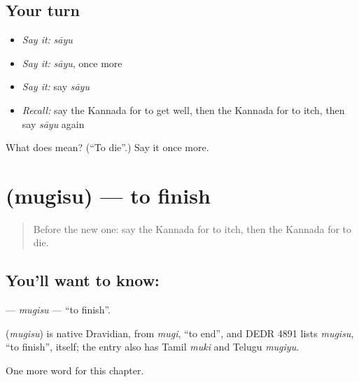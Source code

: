 \subsection*{Your turn}
\begin{itemize}
\raggedright
  \item \emph{Say it:} \emph{sāyu}
  \item \emph{Say it:} \emph{sāyu}, once more
  \item \emph{Say it:} say \emph{sāyu}
  \item \emph{Recall:} say the Kannada for to get well, then the Kannada for to itch, then say \emph{sāyu} again
\end{itemize}

\begin{tcolorbox}[breakable,colback=teal!4,colframe=teal!35!black,title={Before you move on}]
What does  mean? (\textquotedblleft{}To die\textquotedblright{}.) Say it once more.
\end{tcolorbox}
\section[\texorpdfstring{\kn{ಮುಗಿಸು} (mugisu)}{ಮುಗಿಸು (mugisu)}]{ (mugisu) — to finish}

\label{lesson:KA-C200-mugisu}



\begin{quote}
Before the new one: say the Kannada for to itch, then the Kannada for to die.
\end{quote}

\subsection*{You'll want to know: }
\textbf{} — \emph{mugisu} — \textquotedblleft{}to finish\textquotedblright{}.

\begin{cousinweb}
\textbf{} (\emph{mugisu}) is native Dravidian, from \emph{mugi}, \textquotedblleft{}to end\textquotedblright{}, and DEDR 4891 lists \emph{mugisu}, \textquotedblleft{}to finish\textquotedblright{}, itself; the entry also has Tamil \emph{muki} and Telugu \emph{mugiyu}.
\end{cousinweb}

\begin{grammarlens}[title={What you've built}]
One more word for this chapter.
\end{grammarlens}

